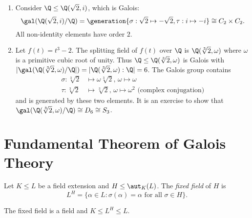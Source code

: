 \documentclass[a4paper]{article}
\begin{document}
\begin{eg}\leavevmode
  \begin{enumerate}
  \item Consider \(\Q \leq \Q(\sqrt 2, i)\), which is Galois:
    \[
      \gal(\Q(\sqrt 2, i)/\Q) = \generation{\sigma: \sqrt 2 \mapsto -\sqrt 2, \tau: i \mapsto -i} \cong C_2 \times C_2.
    \]
    All non-identity elements have order \(2\).
  \item Let \(f(t) = t^3 - 2\). The splitting field of \(f(t)\) over \(\Q\) is \(\Q(\sqrt[3]{2}, \omega)\) where \(\omega\) is a primitive cubic root of unity. Thus \(\Q \leq \Q(\sqrt[3]{2}, \omega)\) is Galois with \(|\gal(\Q(\sqrt[3]{2}, \omega)/\Q|) = |\Q(\sqrt[3]{2}, \omega):\Q| = 6\). The Galois group contains
    \begin{align*}
      \sigma: \sqrt[3]{2} &\mapsto \omega\sqrt[3]{2}, \, \omega \mapsto \omega \\
      \tau: \sqrt[3]{2} &\mapsto \sqrt[3]{2}, \, \omega \mapsto \omega^2 \text{ (complex conjugation)}
    \end{align*}
    and is generated by these two elements. It is an exercise to show that \(\gal(\Q(\sqrt[3]{2}, \omega)/\Q) \cong D_6 \cong S_3\).
  \end{enumerate}
\end{eg}

\section{Fundamental Theorem of Galois Theory}

\begin{definition}
  Let \(K \leq L\) be a field extension and \(H \leq \aut_K(L)\). The \emph{fixed field} of \(H\) is
  \[
    L^H = \{\alpha \in L: \sigma(\alpha) = \alpha \text{ for all } \sigma \in H \}.
  \]
\end{definition}

The fixed field is a field and \(K \leq L^H \leq L\).
\end{document}
